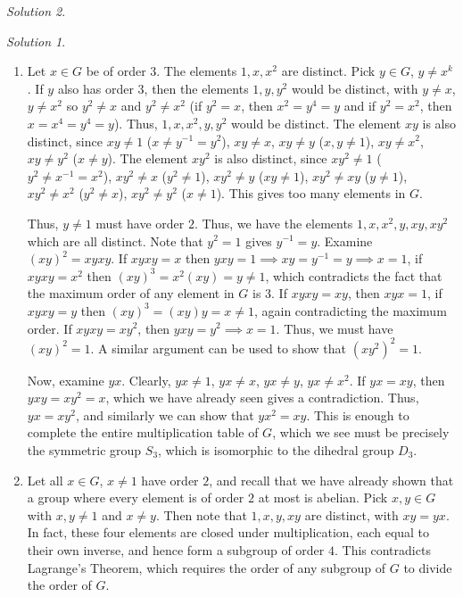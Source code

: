 \documentclass[11pt]{report}
\theoremstyle{remark}
\newtheorem*{solution}{Solution}
\begin{document}
\begin{solution}
\begin{solution}
\begin{enumerate}
        \item Let $x \in G$ be of order $3$. The elements $1, x, x^2$ are distinct.
        Pick $y \in G$, $y \neq x^k$. If $y$ also has order $3$, then the elements
        $1, y, y^2$ would be distinct, with $y \neq x$, $y \neq x^2$ so $y^2 \neq x$
        and $y^2 \neq x^2$ (if $y^2 = x$, then $x^2 = y^4 = y$ and if $y^2 = x^2$,
        then $x = x^4 = y^4 = y$). Thus, $1, x, x^2, y, y^2$ would be distinct. The
        element $xy$ is also distinct, since $xy \neq 1$ ($x \neq y^{-1} = y^2$),
        $xy \neq x$, $xy \neq y$ ($x, y \neq 1$), $xy \neq x^2$, $xy \neq y^2$ ($x
        \neq y$). The element $xy^2$ is also distinct, since $xy^2 \neq 1$ ($y^2
        \neq x^{-1} = x^2$), $xy^2 \neq x$ ($y^2 \neq 1$), $xy^2 \neq y$ ($xy \neq
        1$), $xy^2 \neq xy$ ($y \neq 1$), $xy^2 \neq x^2$ ($y^2 \neq x$), $xy^2 \neq
        y^2$ ($x \neq 1$). This gives too many elements in $G$.

        Thus, $y \neq 1$ must have order $2$. Thus, we have the elements $1, x, x^2,
        y, xy, xy^2$ which are all distinct. Note that $y^2 = 1$ gives $y^{-1} = y$.
        Examine $(xy)^2 = xyxy$. If $xyxy = x$ then $yxy = 1 \implies xy = y^{-1} =
        y \implies x = 1$, if $xyxy = x^2$ then $(xy)^3 = x^2(xy) = y \neq 1$, which
        contradicts the fact that the maximum order of any element in $G$ is $3$.
        If $xyxy = xy$, then $xyx = 1$, if $xyxy = y$ then $(xy)^3 = (xy)y = x \neq
        1$, again contradicting the maximum order. If $xyxy = xy^2$, then $yxy = y^2
        \implies x = 1$. Thus, we must have $(xy)^2 = 1$. A similar argument can be
        used to show that $(xy^2)^2 = 1$.

        Now, examine $yx$. Clearly, $yx \neq 1$, $yx \neq x$, $yx \neq y$, $yx \neq
        x^2$. If $yx = xy$, then $yxy = xy^2 = x$, which we have already seen gives
        a contradiction. Thus, $yx = xy^2$, and similarly we can show that $yx^2 =
        xy$. This is enough to complete the entire multiplication table of $G$,
        which we see must be precisely the symmetric group $S_3$, which is isomorphic
        to the dihedral group $D_3$.

        \item Let all $x \in G$, $x \neq 1$ have order $2$, and recall that we have
        already shown that a group where every element is of order $2$ at most is
        abelian. Pick $x, y \in G$ with $x, y \neq 1$ and $x \neq y$. Then note that
        $1, x, y, xy$ are distinct, with $xy = yx$. In fact, these four elements are
        closed under multiplication, each equal to their own inverse, and hence form
        a subgroup of order $4$. This contradicts Lagrange's Theorem, which requires
        the order of any subgroup of $G$ to divide the order of $G$.
    \end{enumerate}
    \end{solution}
    

\end{solution}
\end{document}
